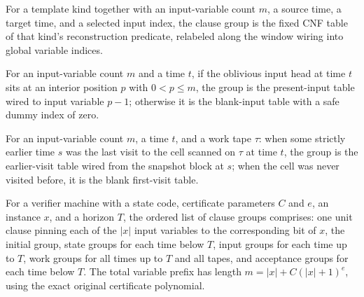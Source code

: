\begin{definition}
\label{Complexity.clGroup}
\leanok
{}
For a template kind together with an input-variable count $m$, a source time, a target time, and a selected input index, the clause group is the fixed CNF table of that kind's reconstruction predicate, relabeled along the window wiring into global variable indices.
\end{definition}

\begin{definition}
\label{Complexity.clInputGroup}
\leanok
{}
For an input-variable count $m$ and a time $t$, if the oblivious input head at time $t$ sits at an interior position $p$ with $0 < p \le m$, the group is the present-input table wired to input variable $p-1$; otherwise it is the blank-input table with a safe dummy index of zero.
\end{definition}

\begin{definition}
\label{Complexity.clWorkGroup}
\leanok
{}
For an input-variable count $m$, a time $t$, and a work tape $\tau$: when some strictly earlier time $s$ was the last visit to the cell scanned on $\tau$ at time $t$, the group is the earlier-visit table wired from the snapshot block at $s$; when the cell was never visited before, it is the blank first-visit table.
\end{definition}

\begin{definition}
\label{Complexity.clTableauGroups}
\leanok
{}
For a verifier machine with a state code, certificate parameters $C$ and $e$, an instance $x$, and a horizon $T$, the ordered list of clause groups comprises: one unit clause pinning each of the $|x|$ input variables to the corresponding bit of $x$, the initial group, state groups for each time below $T$, input groups for each time up to $T$, work groups for all times up to $T$ and all tapes, and acceptance groups for each time below $T$. The total variable prefix has length $m = |x| + C(|x|+1)^e$, using the exact original certificate polynomial.
\end{definition}

